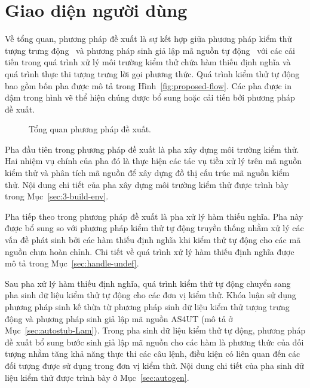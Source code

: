 \section{Giao diện người dùng}\label{sec:UI}
Về tổng quan, phương pháp đề xuất là sự kết hợp giữa phương pháp kiểm thử tượng trưng động~\cite{ConcolicTesting} và phương pháp sinh giả lập mã nguồn tự động~\cite{TUNG2022106821} với các cải tiến trong quá trình xử lý môi trường kiểm thử chứa hàm thiếu định nghĩa và quá trình thực thi tượng trưng lời gọi phương thức. Quá trình kiểm thử tự động bao gồm bốn pha được mô tả trong Hình~\autoref{fig:proposed-flow}. Các pha được in đậm trong hình vẽ thể hiện chúng được bổ sung hoặc cải tiến bởi phương pháp đề xuất.

\begin{figure}[h]
    \centering
    
    \caption{Tổng quan phương pháp đề xuất.}
    \label{fig:proposed-flow}
\end{figure}

Pha đầu tiên trong phương pháp đề xuất là pha xây dựng môi trường kiểm thử. Hai nhiệm vụ chính của pha đó là thực hiện các tác vụ tiền xử lý trên mã nguồn kiểm thử và phân tích mã nguồn để xây dựng đồ thị cấu trúc mã nguồn kiểm thử. Nội dung chi tiết của pha xây dựng môi trường kiểm thử được trình bày trong Mục~\autoref{sec:3-build-env}.

Pha tiếp theo trong phương pháp đề xuất là pha xử lý hàm thiếu nghĩa. Pha này được bổ sung so với phương pháp kiểm thử tự động truyền thống nhằm xử lý các vấn đề phát sinh bởi các hàm thiếu định nghĩa khi kiểm thử tự động cho các mã nguồn chưa hoàn chỉnh. Chi tiết về quá trình xử lý hàm thiếu định nghĩa được mô tả trong Mục~\autoref{sec:handle-undef}.

Sau pha xử lý hàm thiếu định nghĩa, quá trình kiểm thử tự động chuyển sang pha sinh dữ liệu kiểm thử tự động cho các đơn vị kiểm thử. Khóa luận sử dụng phương pháp sinh kế thừa từ phương pháp sinh dữ liệu kiểm thử tượng trưng động và phương pháp sinh giả lập mã nguồn AS4UT (mô tả ở Mục~\autoref{sec:autostub-Lam}). Trong pha sinh dữ liệu kiểm thử tự động, phương pháp đề xuất bổ sung bước sinh giả lập mã nguồn cho các hàm là phương thức của đối tượng nhằm tăng khả năng thực thi các câu lệnh, điều kiện có liên quan đến các đối tượng được sử dụng trong đơn vị kiểm thử. Nội dung chi tiết của pha sinh dữ liệu kiểm thử được trình bày ở Mục~\autoref{sec:autogen}. 

